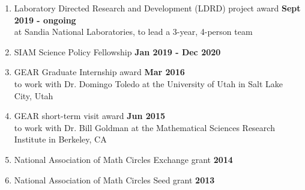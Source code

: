 \documentclass[margin,line]{res}
\begin{document}
\begin{resume}
\begin{enumerate}
\item Laboratory Directed Research and Development (LDRD) project award \hfill {\bf Sept 2019 - ongoing}\\
at Sandia National Laboratories, to lead a 3-year, 4-person team
\item SIAM Science Policy Fellowship \hfill {\bf Jan 2019 - Dec 2020}
\item GEAR Graduate Internship award \hfill {\bf Mar 2016} \\
to work with Dr. Domingo Toledo at the University of Utah in Salt Lake City, Utah
\item GEAR short-term visit award \hfill {\bf Jun 2015} \\
to work with Dr. Bill Goldman at the Mathematical Sciences Research Institute in Berkeley, CA
\item National Association of Math Circles Exchange grant \hfill {\bf 2014}
\item National Association of Math Circles Seed grant \hfill {\bf 2013}
\end{enumerate}


\end{resume}
\end{document}
